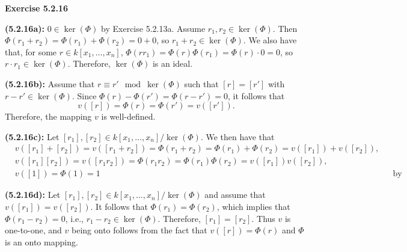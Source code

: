\documentclass[12pt,oneside]{article}
\newenvironment{exercise}[1]{\vspace{.1in}\noindent\textbf{Exercise #1 \hspace{.05em}}}{}
\begin{document}

\begin{exercise}{5.2.16}

    \bigskip
    \textbf{(5.2.16a):}
    $0 \in \ker(\Phi)$ by Exercise 5.2.13a. Assume $r_1,r_2 \in \ker(\Phi)$.
    Then $\Phi(r_1+r_2) = \Phi(r_1)+\Phi(r_2)=0+0$, so $r_1+r_2 \in \ker(\Phi)$.
    We also have that, for some $r \in k[x_1,\ldots,x_n]$,
    $\Phi(rr_1)=\Phi(r)\Phi(r_1)=\Phi(r)\cdot0=0$, so $r\cdot r_1 \in \ker(\Phi)$.
    Therefore, $\ker(\Phi)$ is an ideal.

    \bigskip
    \textbf{(5.2.16b):}
    Assume that $r\equiv r' \mod \ker(\Phi)$ such that $[r]=[r']$ 
    with $r-r'\in \ker(\Phi)$. Since $\Phi(r)-\Phi(r')=\Phi(r-r')=0$,
    it follows that 
    \[
        v([r])=\Phi(r)=\Phi(r')=v([r']).    
    \]
    Therefore, the mapping $v$ is well-defined.

    \bigskip
    \textbf{(5.2.16c):}
    Let $[r_1],[r_2] \in k[x_1,\ldots,x_n]/\ker(\Phi)$. We then have 
    that 
    \begin{align*}
        &v([r_1]+[r_2])  = v([r_1+r_2])=\Phi(r_1+r_2)=\Phi(r_1)+\Phi(r_2)=v([r_1])+v([r_2]),\\
        &v([r_1][r_2])   = v([r_1r_2]) = \Phi(r_1r_2)=\Phi(r_1)\Phi(r_2)=v([r_1])v([r_2]),\\
        &v([1])          = \Phi(1)=1    && \text{by Exercies 5.2.8a}
    \end{align*}

    \bigskip
    \textbf{(5.2.16d):}
    Let $[r_1],[r_2] \in k[x_1,\ldots,x_n]/\ker(\Phi)$ and assume 
    that $v([r_1])=v([r_2])$. It follows that $\Phi(r_1)=\Phi(r_2)$, 
    which implies that $\Phi(r_1-r_2)=0$, i.e., $r_1-r_2 \in \ker(\Phi)$.
    Therefore, $[r_1]=[r_2]$. Thus $v$ is one-to-one, and $v$ 
    being onto follows from the fact that $v([r])=\Phi(r)$ and $\Phi$ 
    is an onto mapping.

\end{exercise}


\end{document}
